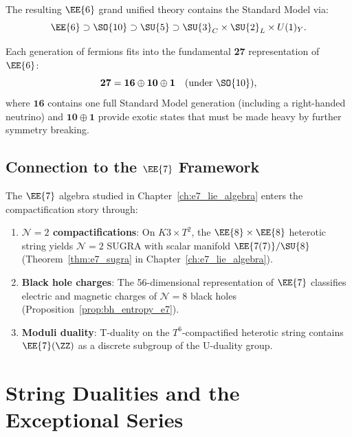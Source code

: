 The resulting $\EE{6}$ grand unified theory contains the Standard Model via:
\begin{equation}
\label{eq:e6_breaking}
\EE{6} \supset \SO{10} \supset \SU{5} \supset
\SU{3}_C \times \SU{2}_L \times U(1)_Y.
\end{equation}

Each generation of fermions fits into the fundamental \textbf{27} representation
of $\EE{6}$:
\begin{equation}
\mathbf{27} = \mathbf{16} \oplus \mathbf{10} \oplus \mathbf{1}
\quad (\text{under } \SO{10}),
\end{equation}
where $\mathbf{16}$ contains one full Standard Model generation (including a
right-handed neutrino) and $\mathbf{10} \oplus \mathbf{1}$ provide exotic states
that must be made heavy by further symmetry breaking.

\subsection{Connection to the $\EE{7}$ Framework}

The $\EE{7}$ algebra studied in Chapter~\ref{ch:e7_lie_algebra} enters the
compactification story through:
\begin{enumerate}
    \item \textbf{$\mathcal{N}=2$ compactifications}: On $K3 \times T^2$, the
          $\EE{8}\times\EE{8}$ heterotic string yields $\mathcal{N}=2$ SUGRA
          with scalar manifold $\EE{7(7)}/\SU{8}$
          (Theorem~\ref{thm:e7_sugra} in Chapter~\ref{ch:e7_lie_algebra}).
    \item \textbf{Black hole charges}: The 56-dimensional representation of
          $\EE{7}$ classifies electric and magnetic charges of
          $\mathcal{N}=8$ black holes (Proposition~\ref{prop:bh_entropy_e7}).
    \item \textbf{Moduli duality}: T-duality on the $T^6$-compactified
          heterotic string contains $\EE{7}(\ZZ)$ as a discrete subgroup
          of the U-duality group.
\end{enumerate}

\section{String Dualities and the Exceptional Series}
\label{sec:dualities}

